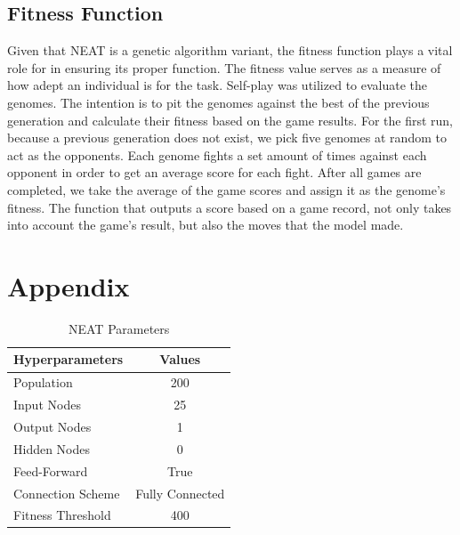 \documentclass[letterpaper, 12pt]{article}
\begin{document}
\subsection*{Fitness Function}
Given that NEAT is a genetic algorithm variant, the fitness function plays a vital role
for in ensuring its proper function. The fitness value serves as a measure of how adept
an individual is for the task. Self-play was utilized to evaluate the genomes. The
intention is to pit the genomes against the best of the previous generation and
calculate their fitness based on the game results. For the first run, because a previous
generation does not exist, we pick five genomes at random to act as the opponents. Each
genome fights a set amount of times against each opponent in order to get an average
score for each fight. After all games are completed, we take the average of the game
scores and assign it as the genome's fitness. The function that outputs a score based on
a game record, not only takes into account the game's result, but also the moves that
the model made.

\section*{Appendix}

\begin{table}[H]
\centering
\caption{NEAT Parameters}
\begin{NiceTabular}{X|c}
\toprule
\textbf{Hyperparameters} & \textbf{Values} \\
\midrule
Population  & 200 \\
Input Nodes  & 25 \\
Output Nodes  & 1 \\
Hidden Nodes & 0 \\
Feed-Forward & True \\
Connection Scheme & Fully Connected \\
Fitness Threshold & 400 \\
\bottomrule
\end{NiceTabular}
\end{table}
\end{document}
